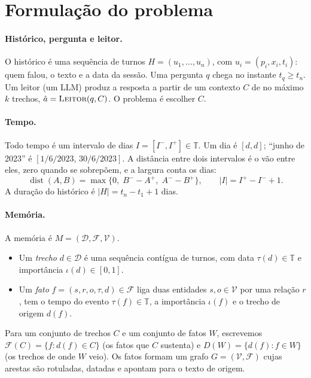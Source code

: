 \documentclass[11pt]{article}
\theoremstyle{definition}
\theoremstyle{plain}
\newcommand{\op}[1]{\textsc{#1}}
\newcommand{\D}{\mathcal{D}}          %
\newcommand{\F}{\mathcal{F}}          %
\newcommand{\V}{\mathcal{V}}          %
\newcommand{\T}{\mathbb{T}}           %
\newcommand{\dist}{\operatorname{dist}}
\begin{document}
\section{Formulação do problema}

\paragraph{Histórico, pergunta e leitor.}
O histórico é uma sequência de turnos $H=(u_1,\dots,u_n)$, com
$u_i=(p_i,x_i,t_i)$: quem falou, o texto e a data da sessão. Uma pergunta $q$
chega no instante $t_q\ge t_n$. Um leitor (um LLM) produz a resposta a partir
de um contexto $C$ de no máximo $k$ trechos, $\hat a=\op{Leitor}(q,C)$. O
problema é escolher $C$.

\paragraph{Tempo.}
Todo tempo é um intervalo de dias $I=[I^-,I^+]\in\T$. Um dia é $[d,d]$;
``junho de 2023'' é $[1/6/2023,\,30/6/2023]$. A distância entre dois
intervalos é o vão entre eles, zero quando se sobrepõem, e a largura conta os
dias:
\begin{equation*}
\dist(A,B)=\max\{0,\;B^- - A^+,\;A^- - B^+\},\qquad |I| = I^+ - I^- + 1 .
\end{equation*}
A duração do histórico é $|H|=t_n-t_1+1$ dias.

\paragraph{Memória.}
A memória é $M=(\D,\F,\V)$.
\begin{itemize}[leftmargin=*,itemsep=1pt]
\item Um \emph{trecho} $d\in\D$ é uma sequência contígua de turnos, com data
  $\tau(d)\in\T$ e importância $\iota(d)\in[0,1]$.
\item Um \emph{fato} $f=(s,r,o,\tau,d)\in\F$ liga duas entidades
  $s,o\in\V$ por uma relação $r$, tem o tempo do evento $\tau(f)\in\T$, a
  importância $\iota(f)$ e o trecho de origem $d(f)$.
\end{itemize}
Para um conjunto de trechos $C$ e um conjunto de fatos $W$, escrevemos
$\F(C)=\{f:d(f)\in C\}$ (os fatos que $C$ sustenta) e
$D(W)=\{d(f):f\in W\}$ (os trechos de onde $W$ veio). Os fatos formam um
grafo $G=(\V,\F)$ cujas arestas são rotuladas, datadas e apontam para o texto
de origem.
\end{document}

